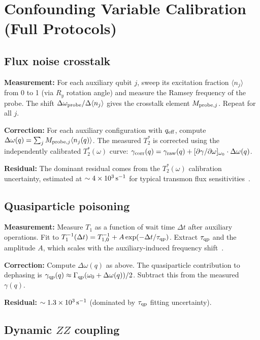 \documentclass[aps,prl,twocolumn]{revtex4-2}
\begin{document}
\section{Confounding Variable Calibration (Full Protocols)}

\subsection{Flux noise crosstalk}

\textbf{Measurement:} For each auxiliary qubit $j$, sweep its excitation fraction $\langle n_j\rangle$ from 0 to 1 (via $R_y$ rotation angle) and measure the Ramsey frequency of the probe. The shift $\Delta\omega_{\rm probe} / \Delta\langle n_j\rangle$ gives the crosstalk element $M_{{\rm probe},j}$. Repeat for all $j$.

\textbf{Correction:} For each auxiliary configuration with $q_{\rm eff}$, compute $\Delta\omega(q) = \sum_j M_{{\rm probe},j} \langle n_j(q)\rangle$. The measured $T_2^*$ is corrected using the independently calibrated $T_2^*(\omega)$ curve: $\gamma_{\rm corr}(q) = \gamma_{\rm raw}(q) + [\partial\gamma/\partial\omega]_{\omega_0} \cdot \Delta\omega(q)$.

\textbf{Residual:} The dominant residual comes from the $T_2^*(\omega)$ calibration uncertainty, estimated at $\sim 4\times 10^3\,{\rm s}^{-1}$ for typical transmon flux sensitivities~\cite{Krantz:2019}.

\subsection{Quasiparticle poisoning}

\textbf{Measurement:} Measure $T_1$ as a function of wait time $\Delta t$ after auxiliary operations. Fit to $T_1^{-1}(\Delta t) = T_{1,0}^{-1} + A\exp(-\Delta t/\tau_{\rm qp})$. Extract $\tau_{\rm qp}$ and the amplitude $A$, which scales with the auxiliary-induced frequency shift~\cite{Catelani:2011}.

\textbf{Correction:} Compute $\Delta\omega(q)$ as above. The quasiparticle contribution to dephasing is $\gamma_{\rm qp}(q) \approx \Gamma_{\rm qp}(\omega_0 + \Delta\omega(q)) / 2$. Subtract this from the measured $\gamma(q)$.

\textbf{Residual:} $\sim 1.3\times 10^3\,{\rm s}^{-1}$ (dominated by $\tau_{\rm qp}$ fitting uncertainty).

\subsection{Dynamic $ZZ$ coupling}
\end{document}
